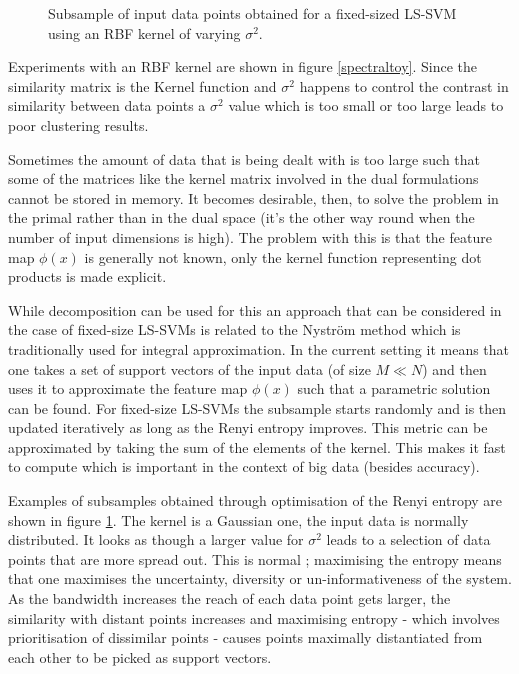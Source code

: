 \begin{figure}
\begin{minipage}{\linewidth}
    \caption*{$\sigma^2=100.0$}
\end{minipage}
\caption{Subsample of input data points obtained for a fixed-sized LS-SVM using an RBF kernel of varying $\sigma^2$.}
\label{fixedsample}
\end{figure}

\par Experiments with an RBF kernel are shown in figure \ref{spectraltoy}. Since the similarity matrix is the Kernel function and $\sigma^2$ happens to control the contrast in similarity between data points a $\sigma^2$ value which is too small or too large leads to poor clustering results.


Sometimes the amount of data that is being dealt with is too large such that some of the matrices like the kernel matrix involved in the dual formulations cannot be stored in memory. It becomes desirable, then, to solve the problem in the primal rather than in the dual space (it's the other way round when the number of input dimensions is high). The problem with this is that the feature map $\phi(x)$ is generally not known, only the kernel function representing dot products is made explicit.

\par While decomposition can be used for this an approach that can be considered in the case of fixed-size LS-SVMs is related to the Nystr\"om method which is traditionally used for integral approximation. In the current setting it means that one takes a set of support vectors of the input data (of size $M\ll N$) and then uses it to approximate the feature map $\phi(x)$ such that a parametric solution can be found. For fixed-size LS-SVMs the subsample starts randomly and is then updated iteratively as long as the Renyi entropy improves. This metric can be approximated by taking the sum of the elements of the kernel. This makes it fast to compute which is important in the context of big data (besides accuracy).

\par Examples of subsamples obtained through optimisation of the Renyi entropy are shown in figure \ref{fixedsample}. The kernel is a Gaussian one, the input data is normally distributed. It looks as though a larger value for $\sigma^2$ leads to a selection of data points that are more spread out. This is normal ; maximising the entropy means that one maximises the uncertainty, diversity or un-informativeness of the system. As the bandwidth increases the reach of each data point gets larger, the similarity with distant points increases and maximising entropy - which involves prioritisation of dissimilar points - causes points maximally distantiated from each other to be picked as support vectors.

